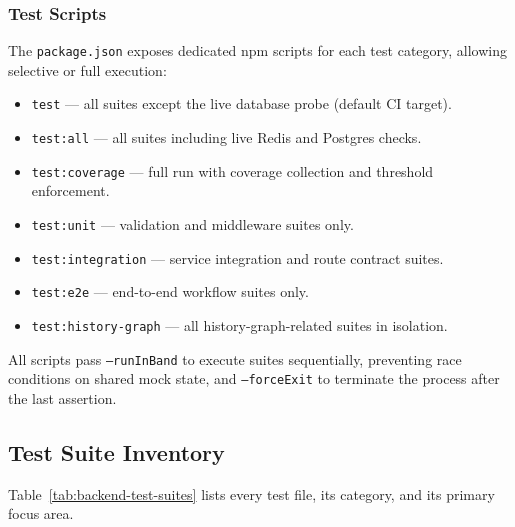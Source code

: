 \subsubsection{Test Scripts}
The \texttt{package.json} exposes dedicated npm scripts for each test category,
allowing selective or full execution:

\begin{itemize}
  \item \texttt{test} --- all suites except the live database probe (default CI target).
  \item \texttt{test:all} --- all suites including live Redis and Postgres checks.
  \item \texttt{test:coverage} --- full run with coverage collection and threshold enforcement.
  \item \texttt{test:unit} --- validation and middleware suites only.
  \item \texttt{test:integration} --- service integration and route contract suites.
  \item \texttt{test:e2e} --- end-to-end workflow suites only.
  \item \texttt{test:history-graph} --- all history-graph-related suites in isolation.
\end{itemize}

All scripts pass \texttt{--runInBand} to execute suites sequentially, preventing
race conditions on shared mock state, and \texttt{--forceExit} to terminate the
process after the last assertion.

\subsection{Test Suite Inventory}

Table~\ref{tab:backend-test-suites} lists every test file, its category, and its
primary focus area.

